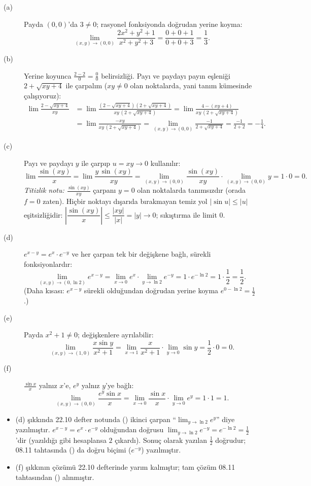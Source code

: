 \begin{cevap}
\begin{description}
  \item[(a)] Payda $(0,0)$'da $3\neq0$; rasyonel fonksiyonda doğrudan yerine koyma:
  \[
  \lim_{(x,y)\to(0,0)}\frac{2x^2+y^2+1}{x^2+y^2+3}=\frac{0+0+1}{0+0+3}=\frac13 .
  \]
  \item[(b)] Yerine koyunca $\frac{2-2}{0}=\frac00$ belirsizliği. Payı ve paydayı payın eşleniği $2+\sqrt{xy+4}$ ile
  çarpalım ($xy\neq0$ olan noktalarda, yani tanım kümesinde çalışıyoruz):
  \begin{align*}
  \lim\frac{2-\sqrt{xy+4}}{xy}
  &=\lim\frac{(2-\sqrt{xy+4})(2+\sqrt{xy+4})}{xy\,(2+\sqrt{xy+4})}
   =\lim\frac{4-(xy+4)}{xy\,(2+\sqrt{xy+4})}\\
  &=\lim\frac{-xy}{xy\,(2+\sqrt{xy+4})}
   =\lim_{(x,y)\to(0,0)}\frac{-1}{2+\sqrt{xy+4}}=\frac{-1}{2+2}=-\frac14 .
  \end{align*}
  \item[(c)] Payı ve paydayı $y$ ile çarpıp $u=xy\to0$ kullanılır:
  \[
  \lim\frac{\sin(xy)}{x}=\lim\frac{y\,\sin(xy)}{xy}
  =\lim_{(x,y)\to(0,0)}\frac{\sin(xy)}{xy}\cdot\lim_{(x,y)\to(0,0)}y=1\cdot0=0 .
  \]
  \emph{Titizlik notu:} $\frac{\sin(xy)}{xy}$ çarpanı $y=0$ olan noktalarda tanımsızdır (orada $f=0$ zaten). Hiçbir
  noktayı dışarıda bırakmayan temiz yol $|\sin u|\le|u|$ eşitsizliğidir:
  $\left|\dfrac{\sin(xy)}{x}\right|\le\dfrac{|xy|}{|x|}=|y|\to0$; sıkıştırma ile limit $0$.
  \item[(d)] $e^{x-y}=e^x\cdot e^{-y}$ ve her çarpan tek bir değişkene bağlı, sürekli fonksiyonlardır:
  \[
  \lim_{(x,y)\to(0,\ln2)}e^{x-y}=\lim_{x\to0}e^x\cdot\lim_{y\to\ln2}e^{-y}=1\cdot e^{-\ln2}=1\cdot\frac12=\frac12 .
  \]
  (Daha kısası: $e^{x-y}$ sürekli olduğundan doğrudan yerine koyma $e^{0-\ln2}=\tfrac12$.)
  \item[(e)] Payda $x^2+1\neq0$; değişkenlere ayrılabilir:
  \[
  \lim_{(x,y)\to(1,0)}\frac{x\sin y}{x^2+1}=\lim_{x\to1}\frac{x}{x^2+1}\cdot\lim_{y\to0}\sin y=\frac12\cdot0=0 .
  \]
  \item[(f)] $\frac{\sin x}{x}$ yalnız $x$'e, $e^y$ yalnız $y$'ye bağlı:
  \[
  \lim_{(x,y)\to(0,0)}\frac{e^y\sin x}{x}=\lim_{x\to0}\frac{\sin x}{x}\cdot\lim_{y\to0}e^y=1\cdot1=1 .
  \]
\end{description}
\end{cevap}

\begin{dikkat}
\begin{itemize}
  \item (d) şıkkında 22.10 defter notunda () ikinci çarpan ``$\lim_{y\to\ln2}e^{y}$'' diye
        yazılmıştır. $e^{x-y}=e^x\cdot e^{-y}$ olduğundan doğrusu $\lim_{y\to\ln2}e^{-y}=e^{-\ln2}=\tfrac12$'dir (yazıldığı
        gibi hesaplansa $2$ çıkardı). Sonuç olarak yazılan $\tfrac12$ doğrudur; 08.11 tahtasında
        () da doğru biçimi ($e^{-y}$) yazılmıştır.
  \item (f) şıkkının çözümü 22.10 defterinde yarım kalmıştır; tam çözüm 08.11 tahtasından ()
        alınmıştır.
\end{itemize}
\end{dikkat}

